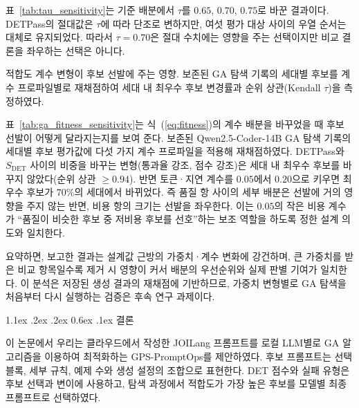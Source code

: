 \documentclass[10pt,twocolumn]{article}
\makeatletter
\newcommand{\sdet}{\ensuremath{S_{\mathrm{DET}}}}
\newenvironment{revision}{\begingroup\color{revisionblue}}{\endgroup}
\renewcommand{\section}{\@startsection{section}{1}{\z@}%
{1.1ex \@plus .2ex \@minus .2ex}%
{0.6ex \@plus .1ex}%
{\normalfont\normalsize\bfseries}}
\makeatother
\begin{document}
\begin{revision}
표~\ref{tab:tau_sensitivity}는 기준 배분에서 $\tau$를 $0.65$, $0.70$, $0.75$로 바꾼 결과이다. DETPass의 절대값은 $\tau$에 따라 단조로 변하지만, 여섯 평가 대상 사이의 우열 순서는 대체로 유지되었다. 따라서 $\tau=0.70$은 절대 수치에는 영향을 주는 선택이지만 비교 결론을 좌우하는 선택은 아니다.

\begin{table}[t]
\color{revisionblue}
\centering
\caption{\textcolor{revisionblue}{적합도 계수 변형이 후보 선발에 주는 영향. 보존된 GA 탐색 기록의 세대별 후보를 계수 프로파일별로 재채점하여 세대 내 최우수 후보 변경률과 순위 상관(Kendall $\tau$)을 측정하였다.}}
\label{tab:ga_fitness_sensitivity}
\footnotesize
\resizebox{\columnwidth}{!}{}
\end{table}

표~\ref{tab:ga_fitness_sensitivity}는 식~(\ref{eq:fitness})의 계수 배분을 바꾸었을 때 후보 선발이 어떻게 달라지는지를 보여 준다. 보존된 Qwen2.5-Coder-14B GA 탐색 기록의 세대별 후보 평가값에 다섯 가지 계수 프로파일을 적용해 재채점하였다. DETPass와 \sdet{} 사이의 비중을 바꾸는 변형(통과율 강조, 점수 강조)은 세대 내 최우수 후보를 바꾸지 않았다(순위 상관 $\geq 0.94$). 반면 토큰·지연 계수를 $0.05$에서 $0.20$으로 키우면 최우수 후보가 $70\%$의 세대에서 바뀌었다. 즉 품질 항 사이의 세부 배분은 선발에 거의 영향을 주지 않는 반면, 비용 항의 크기는 선발을 좌우한다. 이는 $0.05$의 작은 비용 계수가 ``품질이 비슷한 후보 중 저비용 후보를 선호''하는 보조 역할을 하도록 정한 설계 의도와 일치한다.

요약하면, 보고한 결과는 설계값 근방의 가중치·계수 변화에 강건하며, 큰 가중치를 받은 비교 항목일수록 제거 시 영향이 커서 배분의 우선순위와 실제 판별 기여가 일치한다. 이 분석은 저장된 생성 결과의 재채점에 기반하므로, 가중치 변형별로 GA 탐색을 처음부터 다시 실행하는 검증은 후속 연구 과제이다.
\end{revision}

\FloatBarrier

\section{결론}

\begin{revision}
이 논문에서 우리는 클라우드에서 작성한 JOILang 프롬프트를 로컬 LLM별로 GA 알고리즘을 이용하여 최적화하는  GPS-PromptOps를 제안하였다. 후보 프롬프트는 선택 블록, 세부 규칙, 예제 수와 생성 설정의 조합으로 표현한다. DET 점수와 실패 유형은 후보 선택과 변이에 사용하고, 탐색 과정에서 적합도가 가장 높은 후보를 모델별 최종 프롬프트로 선택하였다.
\end{revision}
\end{document}

